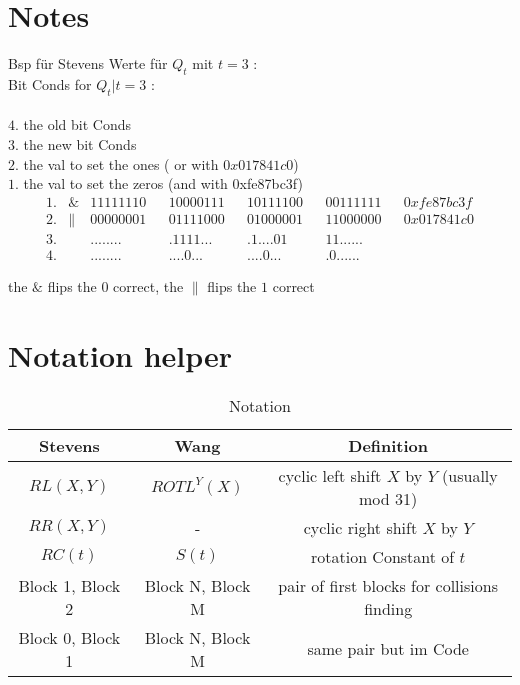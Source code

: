 \section*{Notes}
 
Bsp für Stevens Werte für $Q_t$ mit $t = 3$ :\\
Bit Conds for $Q_t | t =3$ :\\
\\
$4.$ the old bit Conds\\
$3.$ the new bit Conds\\
$2.$ the val to set the ones ( or with $0x017841c0$)\\
$1.$ the val to set the zeros (and with 0xfe87bc3f)\\

\begin{align*}    
    1.& \& & 11111110 & & 10000111 & & 10111100 & & 00111111 & & 0xfe87bc3f \\
    2.& \| & 00000001 & & 01111000 & & 01000001 & & 11000000 & & 0x017841c0 \\
    3.&    & ........ & & .1111... & & .1....01 & & 11...... & &  \\
    4.&    & ........ & & ....0... & & ....0... & & .0...... & &  
\end{align*}

  the $\&$ flips the $0$ correct, the $\|$ flips the $1$ correct


  \newpage

\section{Notation helper}


\begin{table}[]
    \caption*{\large Notation}
    \begin{tabular}{ c | c | c }
    Stevens & Wang  & Definition  \\
    \hline 
    $ RL \left(X , Y \right) $  & $ ROTL^{Y} \left( X\right) $  & cyclic left shift $X$ by $Y$ (usually mod 31) \\
    $ RR \left(X , Y \right) $  & -                             & cyclic right shift $X$ by $Y$  \\
    $ RC \left(t \right) $      &$ S \left(t \right) $          & rotation Constant of $t$ \\
    Block 1, Block 2 & Block N, Block M & pair of first blocks for collisions finding   \\
    Block 0, Block 1 & Block N, Block M & same pair but im Code\\
    \end{tabular}
    \label{notation}
\end{table}

